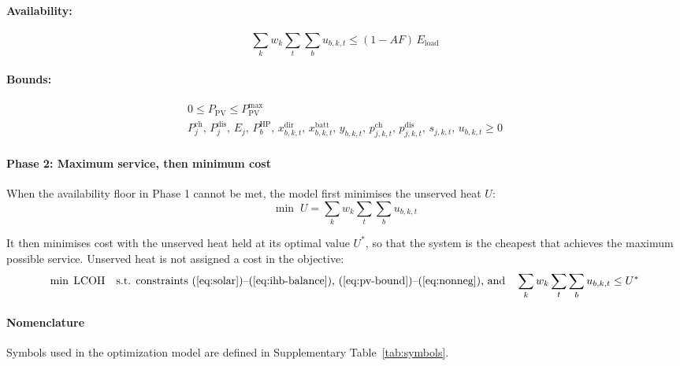 \documentclass[11pt]{article}
\newcommand{\HP}{\mathrm{HP}}
\newcommand{\PV}{\mathrm{PV}}
\newcommand{\ch}{\mathrm{ch}}
\newcommand{\dis}{\mathrm{dis}}
\newcommand{\Eload}{E_{\mathrm{load}}}
\begin{document}
\paragraph{Availability:}
\begin{equation}
\sum_{k} w_{k}\sum_{t}\sum_{b} u_{b,k,t} \leq (1 - AF)\,\Eload
\label{eq:availability}
\end{equation}

\paragraph{Bounds:}
\begin{gather}
0 \leq P_{\PV} \leq P_{\PV}^{\max} \label{eq:pv-bound}\\
P_{j}^{\ch},\, P_{j}^{\dis},\, E_{j},\, P_{b}^{\HP},\, x_{b,k,t}^{\mathrm{dir}},\, x_{b,k,t}^{\mathrm{batt}},\, y_{b,k,t},\, p_{j,k,t}^{\ch},\, p_{j,k,t}^{\dis},\, s_{j,k,t},\, u_{b,k,t} \geq 0 \label{eq:nonneg}
\end{gather}

\paragraph*{Phase 2: Maximum service, then minimum cost}

When the availability floor in Phase 1 cannot be met, the model first minimises the unserved heat $U$:
\begin{equation}
\min\; U = \sum_{k} w_{k}\sum_{t}\sum_{b} u_{b,k,t}
\label{eq:phase2-U}
\end{equation}

It then minimises cost with the unserved heat held at its optimal value $U^{*}$, so that the system is the cheapest that achieves the maximum possible service. Unserved heat is not assigned a cost in the objective:
\begin{equation}
\min\; \mathrm{LCOH} \quad \text{s.t. constraints (\ref{eq:solar})--(\ref{eq:ihb-balance}), (\ref{eq:pv-bound})--(\ref{eq:nonneg}), and} \quad \sum_{k} w_{k}\sum_{t}\sum_{b} u_{b,k,t} \leq U^{*}
\label{eq:phase2-Z}
\end{equation}

\paragraph*{Nomenclature}
Symbols used in the optimization model are defined in Supplementary Table~\ref{tab:symbols}.
\end{document}
